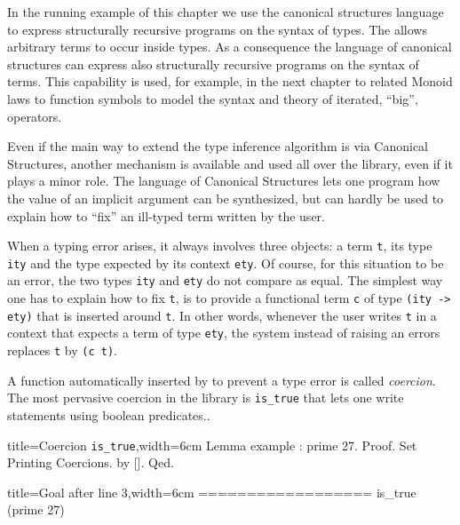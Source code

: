 
In the running example of this chapter we use the canonical structures
language to express structurally recursive programs on the syntax
of types.  The \mcbCIC{} allows arbitrary terms to occur inside
types.  As a consequence the language of canonical structures can
express also structurally recursive programs on the syntax
of terms.  This capability is used, for example, in the next
chapter to related Monoid laws to function symbols to model
the syntax and theory of iterated, ``big'', operators.

\mcbREQUIRE{}
\mcbPROVIDE{}

Even if the main way to extend the type inference algorithm
is via Canonical Structures, another mechanism is available
and used all over the library, even if it plays a minor role.
The language of Canonical Structures lets one program how the value of
an implicit argument can be synthesized, but can hardly be used to
explain \Coq{} how to ``fix'' an ill-typed term written by the user.

When a typing error arises, it always involves three objects:
a term \lstinline/t/, its type \lstinline/ity/ and the type
expected by its context \lstinline/ety/.  Of course, for this
situation to be an error, the two types \lstinline/ity/ and
\lstinline/ety/ do not compare as equal.
The simplest way one has to explain \Coq{} how to fix \lstinline/t/,
is to provide a functional term \lstinline/c/ of type 
\lstinline/(ity -> ety)/ that is inserted around \lstinline/t/.
In other words, whenever the user writes \lstinline/t/ in a context
that expects a term of type \lstinline/ety/, the system instead of
raising an errors replaces \lstinline/t/ by \lstinline/(c t)/.

A function automatically inserted by \Coq{} to prevent a type
error is called \emph{coercion}.
The most pervasive coercion in the \mcbMC{} library is
\lstinline/is_true/ that lets one write statements using boolean
predicates..

\begin{coq}{title=Coercion \lstinline/is_true/,width=6cm}
Lemma example : prime 27.
Proof.
Set Printing Coercions.
by [].
Qed.
\end{coq}
\begin{coqout}{title=Goal after line 3,width=6cm}
==================
is_true (prime 27)
\end{coqout}

